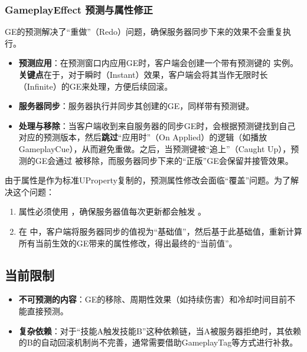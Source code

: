 \documentclass[10pt,CJKmath]{ctexart}
\begin{document}
	\subsubsection{GameplayEffect 预测与属性修正}
	GE的预测解决了“重做”（Redo）问题，确保服务器同步下来的效果不会重复执行。
	
	\begin{itemize}
		\item \textbf{预测应用}：在预测窗口内应用GE时，客户端会创建一个带有预测键的  实例。\textbf{关键点}在于，对于瞬时（Instant）效果，客户端会将其当作无限时长（Infinite）的GE来处理，方便后续回滚。
		\item \textbf{服务器同步}：服务器执行并同步其创建的GE，同样带有预测键。
		\item \textbf{处理与移除}：当客户端收到来自服务器的同步GE时，会根据预测键找到自己对应的预测版本，然后\textbf{跳过}“应用时”（On Applied）的逻辑（如播放GameplayCue），从而避免重做。之后，当预测键被“追上”（Caught Up），预测的GE会通过  被移除，而服务器同步下来的“正版”GE会保留并接管效果。
	\end{itemize}
	
	由于属性是作为标准UProperty复制的，预测属性修改会面临“覆盖”问题。为了解决这个问题：
	\begin{enumerate}
		\item 属性必须使用 ，确保服务器值每次更新都会触发 。
		\item 在  中，客户端将服务器同步的值视为“基础值”，然后基于此基础值，重新计算所有当前生效的GE带来的属性修改，得出最终的“当前值”。
	\end{enumerate}
	
	\subsection{当前限制}
	\begin{itemize}
		\item \textbf{不可预测的内容}：GE的移除、周期性效果（如持续伤害）和冷却时间目前不能直接预测。
		\item \textbf{复杂依赖}：对于“技能A触发技能B”这种依赖链，当A被服务器拒绝时，其依赖的B的自动回滚机制尚不完善，通常需要借助GameplayTag等方式进行补救。
	\end{itemize}
	
\end{document}
